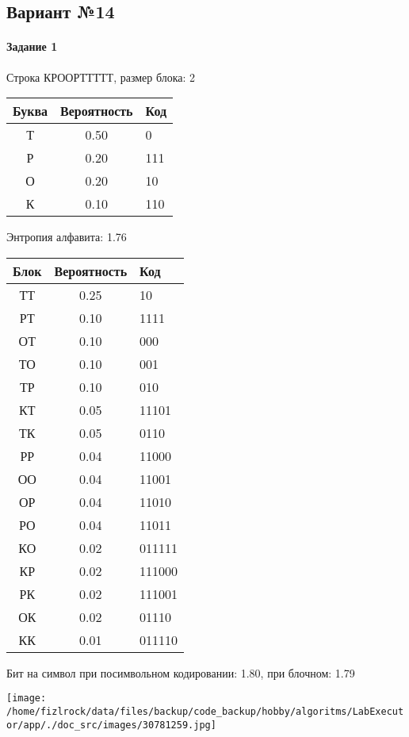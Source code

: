 \documentclass[a4paper, 12pt]{article}
\begin{document}
\subsection{Вариант №14}
\paragraph{Задание 1}

Строка КРООРТТТТТ, размер блока: 2
\begin{center}
 \begin{tabular}{ |c|c|l| } 
  \hline
     Буква & Вероятность & Код\\ \hline
Т & 0.50 & 0\\\hline
Р & 0.20 & 111\\\hline
О & 0.20 & 10\\\hline
К & 0.10 & 110
\\ \hline \end{tabular}
\end{center}
Энтропия алфавита: 1.76
\begin{center}
 \begin{tabular}{ |c|c|l| } 
  \hline
     Блок & Вероятность & Код\\ \hline
ТТ & 0.25 & 10\\\hline
РТ & 0.10 & 1111\\\hline
ОТ & 0.10 & 000\\\hline
ТО & 0.10 & 001\\\hline
ТР & 0.10 & 010\\\hline
КТ & 0.05 & 11101\\\hline
ТК & 0.05 & 0110\\\hline
РР & 0.04 & 11000\\\hline
ОО & 0.04 & 11001\\\hline
ОР & 0.04 & 11010\\\hline
РО & 0.04 & 11011\\\hline
КО & 0.02 & 011111\\\hline
КР & 0.02 & 111000\\\hline
РК & 0.02 & 111001\\\hline
ОК & 0.02 & 01110\\\hline
КК & 0.01 & 011110
\\ \hline \end{tabular}
\end{center}
Бит на символ при посимвольном кодировании: 1.80, при блочном: 1.79

\texttt{[image: /home/fizlrock/data/files/backup/code\_backup/hobby/algoritms/LabExecutor/app/./doc\_src/images/30781259.jpg]}
\end{document}
